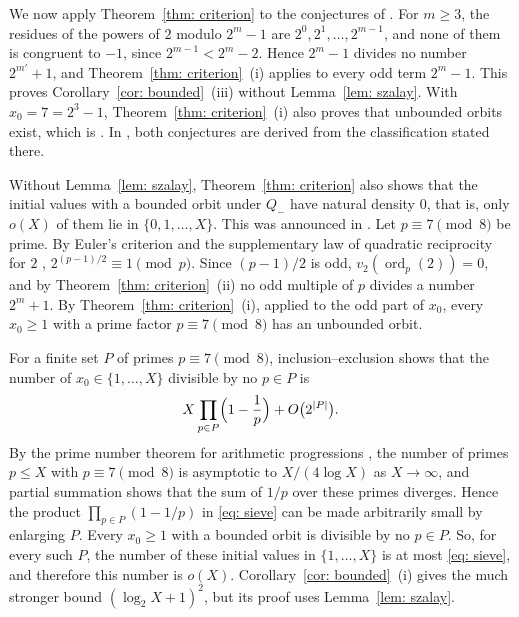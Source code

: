 \documentclass{article}
\newcommand{\Le}{\leqslant}
\newcommand{\Ge}{\geqslant}
\newcommand{\ord}{\operatorname{ord}}
\begin{document}
We now apply Theorem~\ref{thm: criterion} to the conjectures of \citet{sedaghat2020bounded}. For $m \Ge 3$, the residues of the powers of $2$ modulo $2^m - 1$ are $2^0, 2^1, \dots, 2^{m-1}$, and none of them is congruent to $-1$, since $2^{m-1} < 2^m - 2$. Hence $2^m - 1$ divides no number $2^{m'} + 1$, and Theorem~\ref{thm: criterion}~(i) applies to every odd term $2^m - 1$. This proves Corollary~\ref{cor: bounded}~(iii) without Lemma~\ref{lem: szalay}. With $x_0 = 7 = 2^3 - 1$, Theorem~\ref{thm: criterion}~(i) also proves that unbounded orbits exist, which is \citep[Conjecture~3]{sedaghat2020bounded}. In \citep{sedaghat2020dual}, both conjectures are derived from the classification stated there.

Without Lemma~\ref{lem: szalay}, Theorem~\ref{thm: criterion} also shows that the initial values with a bounded orbit under $Q_-$ have natural density $0$, that is, only $o(X)$ of them lie in $\{0, 1, \dots, X\}$. This was announced in \citep{sedaghat2020dual}. Let $p \equiv 7 \pmod 8$ be prime. By Euler's criterion and the supplementary law of quadratic reciprocity for $2$ \citep[Theorem~12.1~(i) and~(iv)]{shoup2008computational}, $2^{(p-1)/2} \equiv 1 \pmod p$. Since $(p-1)/2$ is odd, $v_2(\ord_p(2)) = 0$, and by Theorem~\ref{thm: criterion}~(ii) no odd multiple of $p$ divides a number $2^m + 1$. By Theorem~\ref{thm: criterion}~(i), applied to the odd part of $x_0$, every $x_0 \Ge 1$ with a prime factor $p \equiv 7 \pmod 8$ has an unbounded orbit.

For a finite set $P$ of primes $p \equiv 7 \pmod 8$, inclusion--exclusion shows that the number of $x_0 \in \{1, \dots, X\}$ divisible by no $p \in P$ is
\begin{equation}
    X \prod_{p \in P} \Bigl( 1 - \frac 1p \Bigr) + O \bigl( 2^{|P|} \bigr) .
    \label{eq: sieve}
\end{equation}
By the prime number theorem for arithmetic progressions \citep[Theorem~5.21]{shoup2008computational}, the number of primes $p \Le X$ with $p \equiv 7 \pmod 8$ is asymptotic to $X / (4 \log X)$ as $X \to \infty$, and partial summation shows that the sum of $1/p$ over these primes diverges. Hence the product $\prod_{p \in P} (1 - 1/p)$ in \eqref{eq: sieve} can be made arbitrarily small by enlarging $P$. Every $x_0 \Ge 1$ with a bounded orbit is divisible by no $p \in P$. So, for every such $P$, the number of these initial values in $\{1, \dots, X\}$ is at most \eqref{eq: sieve}, and therefore this number is $o(X)$. Corollary~\ref{cor: bounded}~(i) gives the much stronger bound $(\log_2 X + 1)^2$, but its proof uses Lemma~\ref{lem: szalay}.
\end{document}
